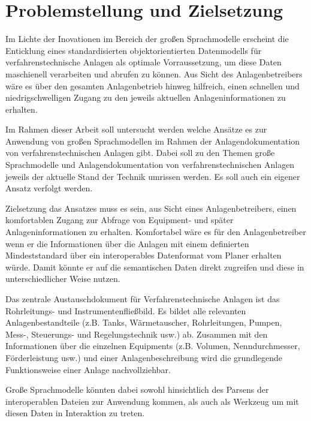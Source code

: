 \section{Problemstellung und Zielsetzung}
\label{sec:related_work}
Im Lichte der Inovationen im Bereich der großen Sprachmodelle erscheint die Enticklung eines standardisierten objektorientierten Datenmodells für verfahrenstechnische Anlagen als optimale Vorraussetzung, um diese Daten maschienell verarbeiten und abrufen zu können. Aus Sicht des Anlagenbetreibers wäre es über den gesamten Anlagenbetrieb hinweg hilfreich, einen schnellen und niedrigschwelligen Zugang zu den jeweils aktuellen Anlageninformationen zu erhalten.

Im Rahmen dieser Arbeit soll untersucht werden welche Ansätze es zur Anwendung von großen Sprachmodellen im Rahmen der Anlagendokumentation von verfahrenstechnischen Anlagen gibt.
Dabei soll zu den Themen große Sprachmodelle und  Anlagendokumentation von verfahrenstechnischen Anlagen jeweils der aktuelle Stand der Technik umrissen werden.
Es soll auch ein eigener Ansatz verfolgt werden.

Zielsetzung das Ansatzes muss es sein, aus Sicht eines Anlagenbetreibers, einen komfortablen Zugang zur Abfrage von Equipment- und später Anlageninformationen zu erhalten. Komfortabel wäre es für den Anlagenbetreiber wenn er die Informationen über die Anlagen mit einem definierten Mindeststandard über ein interoperables Datenformat vom Planer erhalten würde. Damit könnte er auf die semantischen Daten direkt zugreifen und diese in unterschiedlicher Weise nutzen. 

Das zentrale Austauschdokument für Verfahrenstechnische Anlagen ist das Rohrleitungs- und Instrumentenfließbild. Es bildet alle relevanten Anlagenbestandteile (z.B. Tanks, Wärmetauscher, Rohrleitungen, Pumpen, Mess-, Steuerungs- und Regelungstechnik usw.) ab. Zusammen mit den Informationen über die einzelnen Equipments (z.B. Volumen, Nenndurchmesser, Förderleistung usw.) und einer Anlagenbeschreibung wird die grundlegende Funktionsweise einer Anlage nachvollziehbar. 

Große Sprachmodelle könnten dabei sowohl hinsichtlich des Parsens der interoperablen Dateien zur Anwendung kommen, als auch als Werkzeug um mit diesen Daten in Interaktion zu treten.